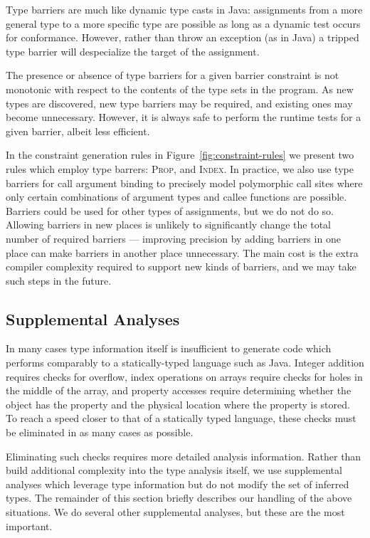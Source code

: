 Type barriers are much like dynamic type casts in Java: assignments from a
more general type to a more specific type are possible as long as a
dynamic test occurs for conformance.
However, rather than throw an exception (as in Java) a tripped type barrier will
despecialize the target of the assignment.

The presence or absence of type barriers for a given barrier constraint is not
monotonic with respect to the contents of the type sets in the program.  As
new types are discovered, new type barriers may be required, and existing ones
may become unnecessary.  However, it is always safe to perform the runtime
tests for a given barrier, albeit less efficient.

In the constraint generation rules in Figure~\ref{fig:constraint-rules} we
present two rules which employ type barrers:
\textsc{Prop}, and \textsc{Index}. In practice, we also use type barriers for
call argument binding to precisely model polymorphic call sites where
only certain combinations of argument types and callee functions are possible.
Barriers could be used for other types of assignments, but we do not do so.
Allowing barriers in new places is unlikely to significantly change the total
number of required barriers --- improving precision by adding barriers in one
place can make barriers in another place unnecessary.
The main cost is the extra compiler complexity required to support new
kinds of barriers, and we may take such steps in the future.

\subsection{Supplemental Analyses}
\label{sec:supplemental-analyses}

In many cases type information itself is insufficient to generate code
which performs comparably to a statically-typed language such as Java.
Integer addition requires checks for overflow,
index operations on arrays require checks for holes in the middle of the array,
and property accesses require determining whether the object has the property
and the physical location where the property is stored.
To reach a speed closer to that of a statically typed language, these checks must
be eliminated in as many cases as possible.

Eliminating such checks requires more detailed analysis information.
Rather than build additional complexity into the type analysis itself,
we use supplemental analyses which leverage type information but do not
modify the set of inferred types.
The remainder of this section briefly describes our handling of the above
situations.
We do several other supplemental analyses, but these are the most important.

